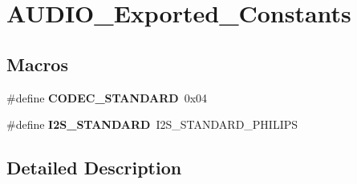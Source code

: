 \hypertarget{group___a_u_d_i_o___exported___constants}{}\section{A\+U\+D\+I\+O\+\_\+\+Exported\+\_\+\+Constants}
\label{group___a_u_d_i_o___exported___constants}
\subsection*{Macros}
\begin{DoxyCompactItemize}
\item 
\mbox{\label{group___a_u_d_i_o___exported___constants_ga7014a1e3190e04c97b6899d85cd14be8}} 
\#define {\bfseries C\+O\+D\+E\+C\+\_\+\+S\+T\+A\+N\+D\+A\+RD}~0x04
\item 
\mbox{\label{group___a_u_d_i_o___exported___constants_ga9034a9122756918439ef3aea85657a92}} 
\#define {\bfseries I2\+S\+\_\+\+S\+T\+A\+N\+D\+A\+RD}~I2\+S\+\_\+\+S\+T\+A\+N\+D\+A\+R\+D\+\_\+\+P\+H\+I\+L\+I\+PS
\end{DoxyCompactItemize}


\subsection{Detailed Description}
